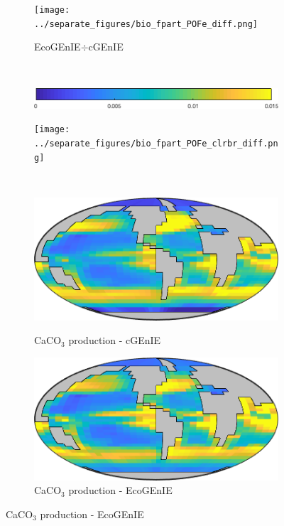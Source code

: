 \documentclass{article}
\begin{document}
\begin{figure}[htp]
\begin{subfigure}{.33\textwidth}
 \caption{EcoGEnIE$\div$cGEnIE}
\texttt{[image: ../separate\_figures/bio\_fpart\_POFe\_diff.png]}
 \label{fig:dpCO2_2}
\end{subfigure}
\\[+0.2cm]
\begin{subfigure}{.49\textwidth}
 \includegraphics[width=0.95\linewidth]{../separate_figures/ECOGEM/bio_fpart_POFe_clrbr.png}
\end{subfigure}
\begin{subfigure}{.49\textwidth}
\texttt{[image: ../separate\_figures/bio\_fpart\_POFe\_clrbr\_diff.png]}
\end{subfigure}
\\[+0.2cm]
\begin{subfigure}{.33\textwidth}
 \caption{CaCO$_3$ production - cGEnIE}
 \includegraphics[width=0.95\linewidth]{../separate_figures/BIOGEM/bio_fpart_CaCO3.png}
 \label{fig:dpCO2_1}
\end{subfigure}%
\begin{subfigure}{.33\textwidth}
 \caption{CaCO$_3$ production - EcoGEnIE}
 \includegraphics[width=0.95\linewidth]{../separate_figures/ECOGEM/bio_fpart_CaCO3.png}

\end{subfigure}
\end{figure}
\end{document}
